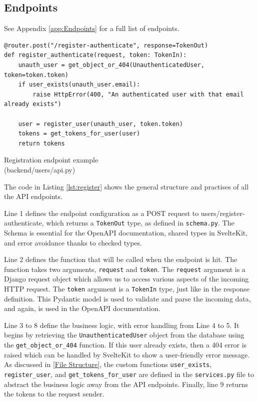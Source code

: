 \subsection{Endpoints}
\vspace{-5pt}
{\footnotesize See Appendix \ref{app:Endpoints} for a full list of endpoints.}
\vspace{-5pt}
\begin{listing}[!ht]
\begin{verbatim}
@router.post("/register-authenticate", response=TokenOut)
def register_authenticate(request, token: TokenIn):
    unauth_user = get_object_or_404(UnauthenticatedUser, token=token.token)
    if user_exists(unauth_user.email):
        raise HttpError(400, "An authenticated user with that email already exists")
    
    user = register_user(unauth_user, token.token)
    tokens = get_tokens_for_user(user)
    return tokens
\end{verbatim}
\vspace{-5pt}
\caption{Registration endpoint example\\(backend/users/api.py)}
\label{lst:register}
\end{listing}
\vspace{-20pt}

The code in Listing \ref{lst:register} shows the general structure and practises of all the API endpoints.

Line 1 defines the endpoint configuration as a POST request to users/register-authenticate, which returns a \texttt{TokenOut} type, as defined in \texttt{schema.py}. The Schema is essential for the OpenAPI documentation, shared types in SvelteKit, and error avoidance thanks to checked types.

Line 2 defines the function that will be called when the endpoint is hit. The function takes two arguments, \texttt{request} and \texttt{token}. The \texttt{request} argument is a Django request object which allows us to access various aspects of the incoming HTTP request. The \texttt{token} argument is a \texttt{TokenIn} type, just like in the response definition. This Pydantic model is used to validate and parse the incoming data, and again, is used in the OpenAPI documentation.

Line 3 to 8 define the business logic, with error handling from Line 4 to 5. It begins by retrieving the \texttt{UnauthenticatedUser} object from the database using the \texttt{get\_object\_or\_404} function. If this user already exists, then a 404 error is raised which can be handled by SvelteKit to show a user-friendly error message. As discussed in \ref{File Structure}, the custom functions \texttt{user\_exists}, \texttt{register\_user}, and \texttt{get\_tokens\_for\_user} are defined in the \texttt{services.py} file to abstract the business logic away from the API endpoints. Finally, line 9 returns the tokens to the request sender.

